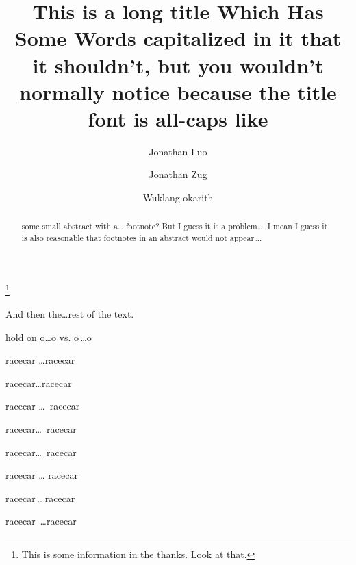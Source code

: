\documentclass{amsart}
\begin{document}
\title{This is a long title Which Has Some Words capitalized in it that it shouldn't, but you wouldn't normally notice because the title font is all-caps like}
\author{Jonathan Luo}
\address{Gorgeoso luiville and what is you deal; {\normalfont and} sure thing anyway}

\author{Jonathan Zug}
\address{ponderoso squatch and some other stuff, man}

\author{Wuklang okarith}
\address{ostensinobal quickdraw and the principle difference cluster}

\thanks{This is some information in the thanks. Look at that.}


\begin{abstract}
  some small abstract with a\dots{} footnote? But I guess it is a problem\dots. I mean I guess it is also reasonable that footnotes in an abstract would not appear\dots.
\end{abstract}

\maketitle

And then the\dots rest of the text.

hold on o\dots o vs. o\,\dots o



racecar \dots racecar

racecar\dots racecar

racecar \dots\ racecar

racecar\dots\ racecar

racecar\dots\, racecar

racecar \dots\! racecar

racecar\,\dots\,racecar

racecar\, \dots racecar
\end{document}
